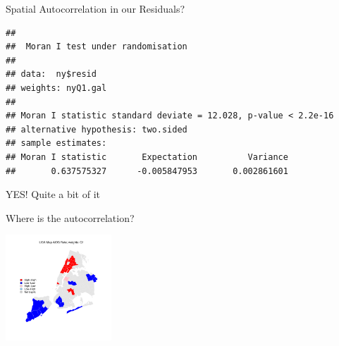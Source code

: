 \documentclass[aspectratio = 169, 12pt]{beamer}\usepackage[]{graphicx}\usepackage[]{color}
\makeatletter
\newenvironment{kframe}{%
 \def\at@end@of@kframe{}%
 \ifinner\ifhmode%
  \def\at@end@of@kframe{\end{minipage}}%
  \begin{minipage}{\columnwidth}%
 \fi\fi%
 \def\FrameCommand##1{\hskip\@totalleftmargin \hskip-\fboxsep
 \colorbox{shadecolor}{##1}\hskip-\fboxsep
     \hskip-\linewidth \hskip-\@totalleftmargin \hskip\columnwidth}%
 \MakeFramed {\advance\hsize-\width
   \@totalleftmargin\z@ \linewidth\hsize
   \@setminipage}}%
 {\par\unskip\endMakeFramed%
 \at@end@of@kframe}
\newenvironment{knitrout}{}{} %
\makeatother
\begin{document}
\begin{frame}[fragile]{Spatial Autocorrelation in our Residuals?}
\begin{knitrout}\tiny
{}\color{fgcolor}\begin{kframe}


{\ttfamily\noindent\bfseries\color{errorcolor}{\#\# Error in ogrInfo(dsn = dsn, layer = layer, encoding = encoding, use\_iconv = use\_iconv, : Cannot open data source}}\begin{verbatim}
## 
## 	Moran I test under randomisation
## 
## data:  ny$resid  
## weights: nyQ1.gal  
## 
## Moran I statistic standard deviate = 12.028, p-value < 2.2e-16
## alternative hypothesis: two.sided
## sample estimates:
## Moran I statistic       Expectation          Variance 
##       0.637575327      -0.005847953       0.002861601
\end{verbatim}
\end{kframe}
\end{knitrout}
YES!  Quite a bit of it
\end{frame}

\begin{frame}[fragile]{Where is the autocorrelation?}
\begin{knitrout}\tiny
{}\color{fgcolor}\begin{kframe}


{\ttfamily\noindent\bfseries\color{errorcolor}{\#\# Error in ogrInfo(dsn = dsn, layer = layer, encoding = encoding, use\_iconv = use\_iconv, : Cannot open data source}}\end{kframe}
\includegraphics[width=150px]{figure/unnamed-chunk-11-1} 

\end{knitrout}
\end{frame}
\end{document}
